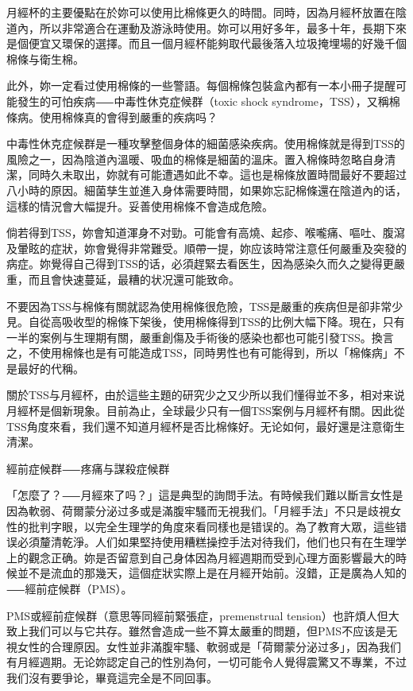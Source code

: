 \documentclass[12pt,UTF8]{ctexbook}
\begin{document}
月經杯的主要優點在於妳可以使用比棉條更久的時間。同時，因為月經杯放置在陰道內，所以非常適合在運動及游泳時使用。妳可以用好多年，最多十年，長期下來是個便宜又環保的選擇。而且一個月經杯能夠取代最後落入垃圾掩埋場的好幾千個棉條与衛生棉。

此外，妳一定看过使用棉條的一些警語。每個棉條包裝盒內都有一本小冊子提醒可能發生的可怕疾病⸺中毒性休克症候群（toxic shock syndrome，TSS），又稱棉條病。使用棉條真的會得到嚴重的疾病吗？

中毒性休克症候群是一種攻擊整個身体的細菌感染疾病。使用棉條就是得到TSS的風險之一，因為陰道內溫暖、吸血的棉條是細菌的溫床。置入棉條時忽略自身清潔，同時久未取出，妳就有可能遭遇如此不幸。這也是棉條放置時間最好不要超过八小時的原因。細菌孳生並進入身体需要時間，如果妳忘記棉條還在陰道內的话，這樣的情況會大幅提升。妥善使用棉條不會造成危險。

倘若得到TSS，妳會知道渾身不对勁。可能會有高燒、起疹、喉嚨痛、嘔吐、腹瀉及暈眩的症狀，妳會覺得非常難受。順帶一提，妳应该時常注意任何嚴重及突發的病症。妳覺得自己得到TSS的话，必須趕緊去看医生，因為感染久而久之變得更嚴重，而且會快速蔓延，最糟的状况還可能致命。

不要因為TSS与棉條有關就認為使用棉條很危險，TSS是嚴重的疾病但是卻非常少見。自從高吸收型的棉條下架後，使用棉條得到TSS的比例大幅下降。現在，只有一半的案例与生理期有關，嚴重創傷及手術後的感染也都也可能引發TSS。換言之，不使用棉條也是有可能造成TSS，同時男性也有可能得到，所以「棉條病」不是最好的代稱。

關於TSS与月經杯，由於這些主題的研究少之又少所以我们懂得並不多，相对来说月經杯是個新現象。目前為止，全球最少只有一個TSS案例与月經杯有關。因此從TSS角度來看，我们還不知道月經杯是否比棉條好。无论如何，最好還是注意衛生清潔。





經前症候群⸺疼痛与謀殺症候群




「怎麼了？⸺月經來了吗？」這是典型的詢問手法。有時候我们難以斷言女性是因為軟弱、荷爾蒙分泌过多或是滿腹牢騷而无視我们。「月經手法」不只是歧視女性的批判字眼，以完全生理学的角度來看同樣也是错误的。為了教育大眾，這些错误必須釐清乾淨。人们如果堅持使用糟糕操控手法对待我们，他们也只有在生理学上的觀念正确。妳是否留意到自己身体因為月經週期而受到心理方面影響最大的時候並不是流血的那幾天，這個症狀实際上是在月經开始前。沒錯，正是廣為人知的⸺經前症候群（PMS）。

PMS或經前症候群（意思等同經前緊張症，premenstrual tension）也許煩人但大致上我们可以与它共存。雖然會造成一些不算太嚴重的問題，但PMS不应该是无視女性的合理原因。女性並非滿腹牢騷、軟弱或是「荷爾蒙分泌过多」，因為我们有月經週期。无论妳認定自己的性別為何，一切可能令人覺得震驚又不專業，不过我们沒有要爭论，畢竟這完全是不同回事。
\end{document}
